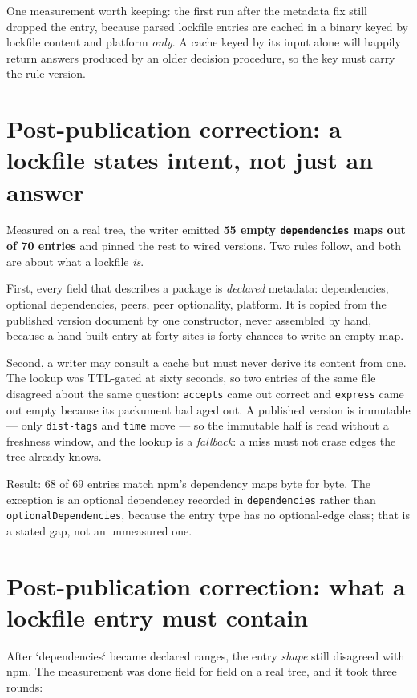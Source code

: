 \documentclass[
  11pt,
  letterpaper,
]{article}
\begin{document}
One measurement worth keeping: the first run after the metadata fix still dropped the entry, because
parsed lockfile entries are cached in a binary keyed by lockfile content and platform \emph{only}. A
cache keyed by its input alone will happily return answers produced by an older decision procedure,
so the key must carry the rule version.


\section{Post-publication correction: a lockfile states intent, not just an answer}

Measured on a real tree, the writer emitted \textbf{55 empty \texttt{dependencies} maps out of
70 entries} and pinned the rest to wired versions. Two rules follow, and both are about what a
lockfile \emph{is}.

First, every field that describes a package is \emph{declared} metadata: dependencies, optional
dependencies, peers, peer optionality, platform. It is copied from the published version document
by one constructor, never assembled by hand, because a hand-built entry at forty sites is forty
chances to write an empty map.

Second, a writer may consult a cache but must never derive its content from one. The lookup was
TTL-gated at sixty seconds, so two entries of the same file disagreed about the same question:
\texttt{accepts} came out correct and \texttt{express} came out empty because its packument had
aged out. A published version is immutable --- only \texttt{dist-tags} and \texttt{time} move ---
so the immutable half is read without a freshness window, and the lookup is a \emph{fallback}:
a miss must not erase edges the tree already knows.

Result: 68 of 69 entries match npm's dependency maps byte for byte. The exception is an optional
dependency recorded in \texttt{dependencies} rather than \texttt{optionalDependencies}, because
the entry type has no optional-edge class; that is a stated gap, not an unmeasured one.


\section{Post-publication correction: what a lockfile entry must contain}

After `dependencies` became declared ranges, the entry \emph{shape} still disagreed with npm. The
measurement was done field for field on a real tree, and it took three rounds:
\end{document}
